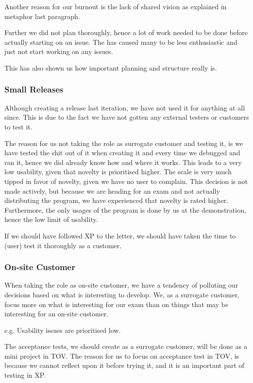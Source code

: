 Another reason for our burnout is the lack of shared vision as explained in metaphor last paragraph.

Further we did not plan thoroughly, hence a lot of work needed to be done before actually starting on an issue. The has caused many to be less enthusiastic and just not start working on any issues.

This has also shown us how important planning and structure really is.

\subsubsection{Small Releases}
Although creating a release last iteration, we have not used it for anything at all since. This is due to the fact we have not gotten any external testers or customers to test it.

The reason for us not taking the role as surrogate customer and testing it, is we have tested the shit out of it when creating it and every time we debugged and ran it, hence we did already know how and where it works.\linebreak
This leads to a very low usability, given that novelty is prioritised higher. The scale is very much tipped in favor of novelty, given we have no user to complain.\linebreak
This decision is not made actively, but because we are heading for an exam and not actually distributing the program, we have experienced that novelty is rated higher.\linebreak
Furthermore, the only usages of the program is done by us at the demonstration, hence the low limit of usability.

If we should have followed XP to the letter, we should have taken the time to (user) test it thoroughly as a customer.

\subsubsection{On-site Customer}
When taking the role as on-site customer, we have a tendency of polluting our decisions based on what is interesting to develop. We, as a surrogate customer, focus more on what is interesting for our exam than on things that may be interesting for an on-site customer.

e.g. Usability issues are prioritised low.

The acceptance tests, we should create as a surrogate customer, will be done as a mini project in TOV. The reason for us to focus on acceptance test in TOV, is because we cannot reflect upon it before trying it, and it is an important part of testing in XP.



